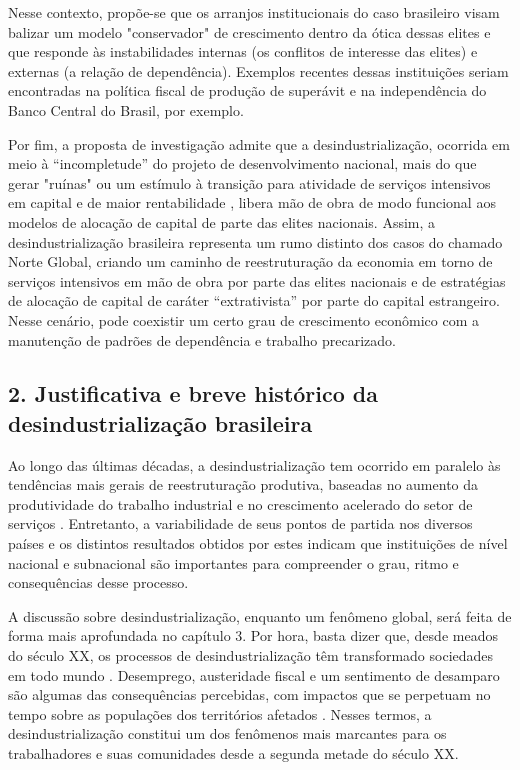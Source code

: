 Nesse contexto, propõe-se que os arranjos institucionais do caso
brasileiro visam balizar um modelo "conservador" de crescimento dentro
da ótica dessas elites e que responde às instabilidades internas (os
conflitos de interesse das elites) e externas (a relação de
dependência). Exemplos recentes dessas instituições seriam encontradas
na política fiscal de produção de superávit e na independência do Banco
Central do Brasil, por exemplo.

Por fim, a proposta de investigação admite que a desindustrialização,
ocorrida em meio à ``incompletude'' do projeto de desenvolvimento
nacional, mais do que gerar "ruínas"
\citep{mah_industrial_2012} ou um
estímulo à transição para atividade de serviços intensivos em capital e
de maior rentabilidade
\citep{amsden2003},
libera mão de obra de modo funcional aos modelos de alocação de capital
de parte das elites nacionais. Assim, a desindustrialização brasileira
representa um rumo distinto dos casos do chamado Norte Global, criando
um caminho de reestruturação da economia em torno de serviços intensivos
em mão de obra por parte das elites nacionais e de estratégias de
alocação de capital de caráter ``extrativista'' por parte do capital
estrangeiro. Nesse cenário, pode coexistir um certo grau de crescimento
econômico com a manutenção de padrões de dependência e trabalho
precarizado.

\subsection{2. Justificativa e breve histórico da desindustrialização brasileira}\label{justificativa-e-breve-histuxf3rico-da-desindustrializauxe7uxe3o-brasileira}

Ao longo das últimas décadas, a desindustrialização tem ocorrido em
paralelo às tendências mais gerais de reestruturação produtiva, baseadas
no aumento da produtividade do trabalho industrial e no crescimento
acelerado do setor de serviços
\citep{rowthorn_growth_1999}. Entretanto, a variabilidade de seus pontos de partida nos
diversos países
\citep{rodrik_premature_2016} e os
distintos resultados obtidos por estes
\citep{bergermussowicke2022} indicam que instituições de nível nacional e subnacional
são importantes para compreender o grau, ritmo e consequências desse
processo.

A discussão sobre desindustrialização, enquanto um fenômeno global, será
feita de forma mais aprofundada no capítulo 3. Por hora, basta dizer
que, desde meados do século XX, os processos de desindustrialização têm
transformado sociedades em todo mundo
 \citep{lawson_making_2020,rodrik_premature_2016,strangleman_deindustrialisation_2017,strangleman_introduction_2013}. Desemprego, austeridade fiscal e um sentimento de desamparo são
algumas das consequências percebidas, com impactos que se perpetuam no
tempo sobre as populações dos territórios afetados
\citep{linkon_half-life_2018,mah_industrial_2012}. Nesses termos, a desindustrialização constitui um dos fenômenos
mais marcantes para os trabalhadores e suas comunidades desde a segunda
metade do século XX.

